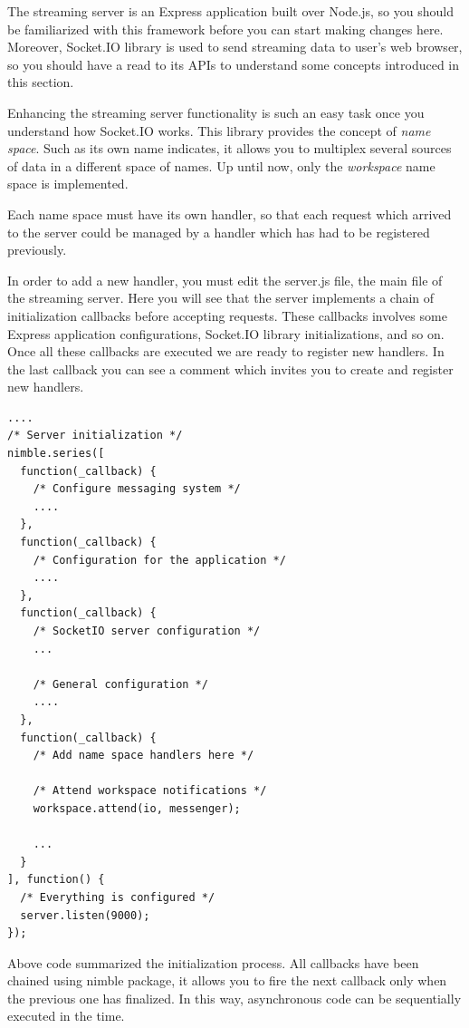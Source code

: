 \documentclass{article}
\begin{document}
The streaming server is an Express application built over Node.js, so you should be familiarized with this framework before you can start making changes here. Moreover, Socket.IO library is used to send streaming data to user's web browser, so you should have a read to its APIs to understand some concepts introduced in this section.

Enhancing the streaming server functionality is such an easy task once you understand how Socket.IO works. This library provides the concept of \textit{name space}. Such as its own name indicates, it allows you to multiplex several sources of data in a different space of names. Up until now, only the \textit{workspace} name space is implemented.

Each name space must have its own handler, so that each request which arrived to the server could be managed by a handler which has had to be registered previously.

In order to add a new handler, you must edit the server.js file, the main file of the streaming server. Here you will see that the server implements a chain of initialization callbacks before accepting requests. These callbacks involves some Express application configurations, Socket.IO library initializations, and so on. Once all these callbacks are executed we are ready to register new handlers. In the last callback you can see a comment which invites you to create and register new handlers.

\begin{verbatim}
....
/* Server initialization */
nimble.series([
  function(_callback) {
    /* Configure messaging system */
    ....
  },
  function(_callback) {
    /* Configuration for the application */
    ....
  },
  function(_callback) {
    /* SocketIO server configuration */
    ...
    
    /* General configuration */
    ....
  },
  function(_callback) {
    /* Add name space handlers here */

    /* Attend workspace notifications */
    workspace.attend(io, messenger);

    ...
  }
], function() {
  /* Everything is configured */
  server.listen(9000);
});
\end{verbatim}

Above code summarized the initialization process. All callbacks have been chained using nimble package, it allows you to fire the next callback only when the previous one has finalized. In this way, asynchronous code can be sequentially executed in the time.
\end{document}
